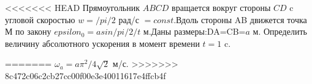 <<<<<<< HEAD
Прямоугольник $ABCD$ вращается вокруг стороны $CD$ c угловой скоростью $w=/pi/2$ рад/с $=const$.Вдоль стороны AB движется точка М по закону $epsilon
_0=a sin/pi/2/t$ м.Даны размеры:DA=CB=$a$ м. Определить величину абсолютного ускорения в момент времени $t=1$ c.
 
=======
$\omega_a=a\pi^2/4 \sqrt{2}$ м/с.
>>>>>>> 8c472c06c2cb27cc00f00e3e40011617e4ffcb4f
